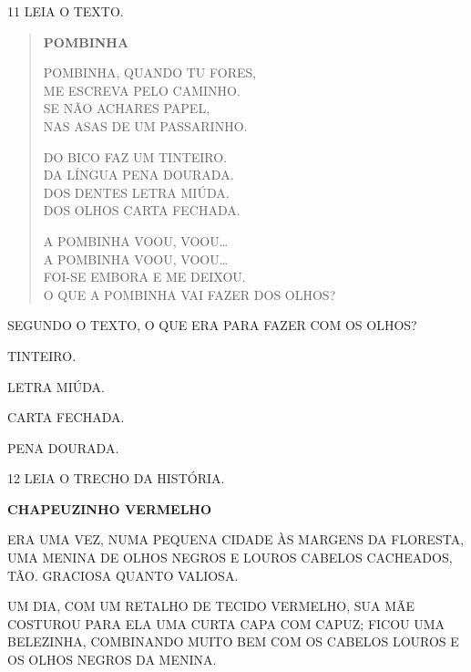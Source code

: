 \num{11} LEIA O TEXTO.

\begin{myquote}
\begin{verse}
\textbf{POMBINHA}

POMBINHA, QUANDO TU FORES,\\
ME ESCREVA PELO CAMINHO.\\
SE NÃO ACHARES PAPEL,\\
NAS ASAS DE UM PASSARINHO.

DO BICO FAZ UM TINTEIRO.\\
DA LÍNGUA PENA DOURADA.\\
DOS DENTES LETRA MIÚDA.\\
DOS OLHOS CARTA FECHADA.

A POMBINHA VOOU, VOOU\ldots{}\\
A POMBINHA VOOU, VOOU\ldots{}\\
FOI-SE EMBORA E ME DEIXOU.\\
O QUE A POMBINHA VAI FAZER DOS OLHOS?
\end{verse}
\end{myquote}

SEGUNDO O TEXTO, O QUE ERA PARA FAZER COM OS OLHOS?

\begin{multicols}{2}
\begin{escolha}
\item TINTEIRO.

\item LETRA MIÚDA.

\item CARTA FECHADA.

\item PENA DOURADA.
\end{escolha}
\end{multicols}

\num{12} LEIA O TRECHO DA HISTÓRIA.

\begin{myquote}
\textbf{CHAPEUZINHO VERMELHO}

ERA UMA VEZ, NUMA PEQUENA CIDADE ÀS MARGENS DA FLORESTA,
UMA MENINA DE OLHOS NEGROS E LOUROS CABELOS CACHEADOS, TÃO.
GRACIOSA QUANTO VALIOSA.

UM DIA, COM UM RETALHO DE TECIDO VERMELHO, SUA MÃE
COSTUROU PARA ELA UMA CURTA CAPA COM CAPUZ; FICOU UMA
BELEZINHA, COMBINANDO MUITO BEM COM OS CABELOS LOUROS E
OS OLHOS NEGROS DA MENINA.

\end{myquote}


